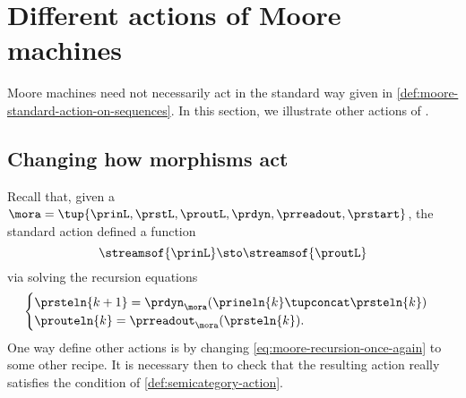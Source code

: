 
\section{Different actions of Moore machines}
\label{sec:different-actions-of-moore-machines}

Moore machines need not necessarily act in the standard way given in \cref{def:moore-standard-action-on-sequences}.
In this section, we illustrate other actions of .

\subsection{Changing how morphisms act}

Recall that, given a ~$\mora = \tup{\prinL,\prstL,\proutL,\prdyn,\prreadout,\prstart}$, the standard action defined a function
\begin{equation}
    \streamsof{\prinL}  \sto \streamsof{\proutL}
\end{equation}
via solving the recursion equations
\begin{equation}
    \label{eq:moore-recursion-once-again}
    \begin{cases}
        \prsteln{k+1} = \prdyn_\mora(\prineln{k} \tupconcat \prsteln{k}) \\
        \prouteln{k}   = \prreadout_\mora(\prsteln{k}).
    \end{cases}
\end{equation}
%
One way define other actions is by changing \cref{eq:moore-recursion-once-again} to some other recipe.
It is necessary then to check that the resulting action really satisfies the condition of \cref{def:semicategory-action}.

